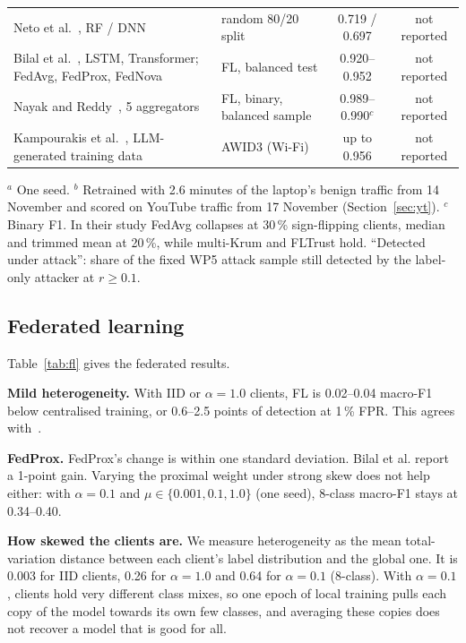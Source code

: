 \documentclass[conference]{IEEEtran}
\begin{document}
\begin{table}[t]
{\begin{tabular}{@{}llccccc@{}}
Neto et al.~\cite{neto2023ciciot}, RF / DNN & random 80/20 split & 0.719 / 0.697 & \multicolumn{4}{c}{not reported} \\
Bilal et al.~\cite{bilal2026dataset}, LSTM, Transformer; FedAvg, FedProx, FedNova & FL, balanced test & 0.920--0.952 & \multicolumn{4}{c}{not reported} \\
Nayak and Reddy~\cite{nayak2026byzantine}, 5 aggregators & FL, binary, balanced sample & 0.989--0.990$^c$ & \multicolumn{4}{c}{not reported} \\
Kampourakis et al.~\cite{kampourakis2026k2d}, LLM-generated training data & AWID3 (Wi-Fi) & up to 0.956 & \multicolumn{4}{c}{not reported} \\
\bottomrule
\end{tabular}}
\par\smallskip\parbox{\textwidth}{\footnotesize $^a$ One seed. $^b$ Retrained with 2.6 minutes of the laptop's benign traffic from 14 November and scored on YouTube traffic from 17 November (Section~\ref{sec:yt}). $^c$ Binary F1. In their study FedAvg collapses at 30\,\% sign-flipping clients, median and trimmed mean at 20\,\%, while multi-Krum and FLTrust hold. ``Detected under attack'': share of the fixed WP5 attack sample still detected by the label-only attacker at $r\ge0.1$.}
\end{table}

\subsection{Federated learning}\label{sec:fl}
Table~\ref{tab:fl} gives the federated results.

\textbf{Mild heterogeneity.} With IID or $\alpha=1.0$ clients, FL is 0.02--0.04 macro-F1 below centralised training, or 0.6--2.5 points of detection at 1\,\% FPR. This agrees with~\cite{bilal2026dataset}.

\textbf{FedProx.} FedProx's change is within one standard deviation. Bilal et al. report a 1-point gain. Varying the proximal weight under strong skew does not help either: with $\alpha=0.1$ and $\mu\in\{0.001, 0.1, 1.0\}$ (one seed), 8-class macro-F1 stays at 0.34--0.40.

\textbf{How skewed the clients are.} We measure heterogeneity as the mean total-variation distance between each client's label distribution and the global one. It is 0.003 for IID clients, 0.26 for $\alpha=1.0$ and 0.64 for $\alpha=0.1$ (8-class). With $\alpha=0.1$, clients hold very different class mixes, so one epoch of local training pulls each copy of the model towards its own few classes, and averaging these copies does not recover a model that is good for all.
\end{document}
